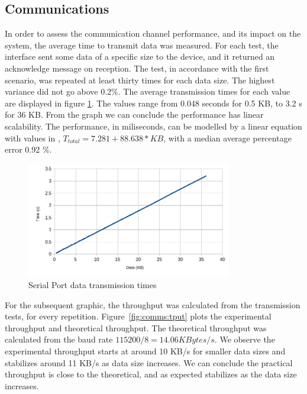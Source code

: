 \subsection{Communications}\label{chap:evaluation:performance:comms}

In order to assess the communication channel performance, and its impact on the system, the average time to transmit data was measured. For each test, the interface sent some data of a specific size to the device, and it returned an acknowledge message on reception. The test, in accordance with the first scenario, was repeated at least thirty times for each data size. The highest variance did not go above 0.2\%.
The average transmission times for each value are displayed in figure \ref{fig:comms:time}.
The values range from 0.048 seconds for 0.5 KB, to 3.2 s for 36 KB.
From the graph we can conclude the performance has linear scalability.
The performance, in miliseconds, can be modelled by a linear equation with values in , \(T_{total} = 7.281 + 88.638 * KB\), with a median average percentage error 0.92 \%.

\begin{figure}[h!]
	\centering
	\includegraphics[width=0.8\textwidth]{./Images/comms-time.png}
	\caption{Serial Port data transmission times}
	\label{fig:comms:time}
\end{figure}

For the subsequent graphic, the throughput was calculated from the transmission tests, for every repetition.
Figure~\ref{fig:comms:tput} plots the experimental throughput and theoretical throughput. The theoretical throughput was calculated from the baud rate \(115200/8 = 14.06 KBytes/s\).
We observe the experimental throughput starts at around 10 KB/s for smaller data sizes and stabilizes around 11 KB/s as data size increases.
We can conclude the practical throughput is close to the theoretical, and as expected stabilizes as the data size increases.

